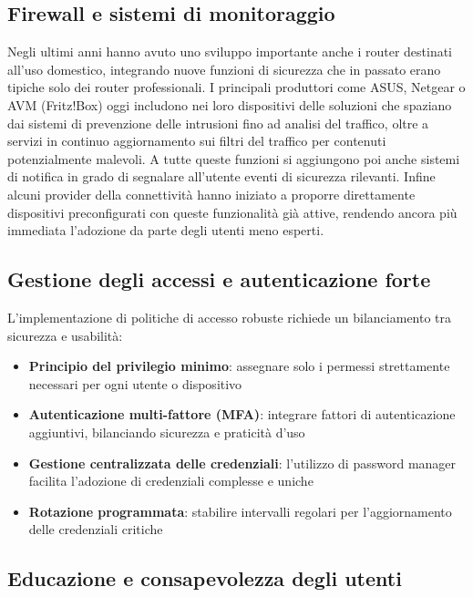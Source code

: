 \subsection{Firewall e sistemi di monitoraggio}

Negli ultimi anni hanno avuto uno sviluppo importante anche i router destinati all’uso domestico, integrando nuove funzioni di sicurezza che in passato erano tipiche solo dei router professionali. I principali produttori come ASUS, Netgear o AVM (Fritz!Box) oggi includono nei loro dispositivi delle soluzioni che spaziano dai sistemi di prevenzione delle intrusioni fino ad analisi del traffico, oltre a servizi in continuo aggiornamento sui filtri del traffico per contenuti potenzialmente malevoli. A tutte queste funzioni si aggiungono poi anche sistemi di notifica in grado di segnalare all’utente eventi di sicurezza rilevanti. Infine alcuni provider della connettività hanno iniziato a proporre direttamente dispositivi preconfigurati con queste funzionalità già attive, rendendo ancora più immediata l’adozione da parte degli utenti meno esperti.

\subsection{Gestione degli accessi e autenticazione forte}

L'implementazione di politiche di accesso robuste richiede un bilanciamento tra sicurezza e usabilità:

\begin{itemize}
    \item \textbf{Principio del privilegio minimo}: assegnare solo i permessi strettamente necessari per ogni utente o dispositivo
    \item \textbf{Autenticazione multi-fattore (MFA)}: integrare fattori di autenticazione aggiuntivi, bilanciando sicurezza e praticità d'uso
    \item \textbf{Gestione centralizzata delle credenziali}: l'utilizzo di password manager facilita l'adozione di credenziali complesse e uniche
    \item \textbf{Rotazione programmata}: stabilire intervalli regolari per l'aggiornamento delle credenziali critiche
\end{itemize}

\subsection{Educazione e consapevolezza degli utenti}

